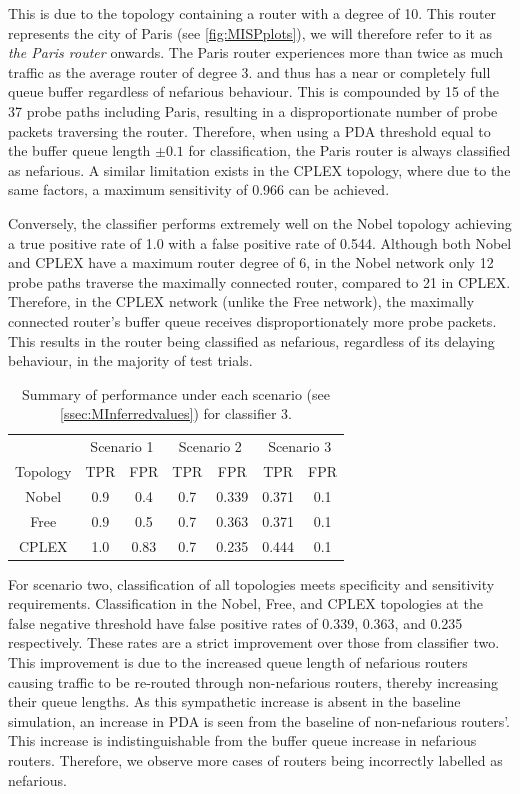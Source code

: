 This is due to the topology containing a router with a degree of 10. This router represents the city of Paris (see \cref{fig:MISPplots}), we will therefore refer to it as \textit{the Paris router} onwards. The Paris router experiences more than twice as much traffic as the average router of degree 3. and thus has a near or completely full queue buffer regardless of nefarious behaviour. This is compounded by 15 of the 37 probe paths including Paris, resulting in a disproportionate number of probe packets traversing the router. Therefore, when using a PDA threshold equal to the buffer queue length $\pm0.1$ for classification, the Paris router is always classified as nefarious. A similar limitation exists in the CPLEX topology, where due to the same factors, a maximum sensitivity of 0.966 can be achieved.\par
Conversely, the classifier performs extremely well on the Nobel topology achieving a true positive rate of 1.0 with a false positive rate of 0.544. Although both Nobel and CPLEX have a maximum router degree of 6, in the Nobel network only 12 probe paths traverse the maximally connected router, compared to 21 in CPLEX. Therefore, in the CPLEX network (unlike the Free network), the maximally connected router's buffer queue receives disproportionately more probe packets. This results in the router being classified as nefarious, regardless of its delaying behaviour, in the majority of test trials.\par
\begin{table}[t]
    \centering
    \begin{tabular}{ccccccc}
        & \multicolumn{2}{c}{Scenario 1} & \multicolumn{2}{c}{Scenario 2} & \multicolumn{2}{c}{Scenario 3}\\
        \cmidrule(lr){2-3} \cmidrule(lr){4-5} \cmidrule(lr){6-7}
        Topology & TPR & FPR & TPR & FPR & TPR & FPR\\
        \midrule
        Nobel & 0.9 & 0.4  & 0.7 & 0.339 & 0.371 & 0.1 \\
        Free  & 0.9 & 0.5  & 0.7 & 0.363 & 0.371 & 0.1 \\
        CPLEX & 1.0 & 0.83 & 0.7 & 0.235 & 0.444 & 0.1 \\
    \end{tabular}
    \caption{Summary of performance under each scenario (see \cref{ssec:MInferredvalues}) for classifier 3.}
    \label{tbl:Rassumptionset3summary}
\end{table}
For scenario two, classification of all topologies meets specificity and sensitivity requirements. Classification in the Nobel, Free, and CPLEX topologies at the false negative threshold have false positive rates of 0.339, 0.363, and 0.235 respectively. These rates are a strict improvement over those from classifier two. This improvement is due to the increased queue length of nefarious routers causing traffic to be re-routed through non-nefarious routers, thereby increasing their queue lengths. As this sympathetic increase is absent in the baseline simulation, an increase in PDA is seen from the baseline of non-nefarious routers’. This increase is indistinguishable from the buffer queue increase in nefarious routers. Therefore, we observe more cases of routers being incorrectly labelled as nefarious.\par
